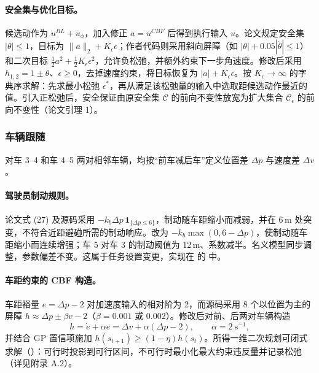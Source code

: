 \documentclass[UTF8,a4paper,zihao=-4,fontset=fandol]{ctexart}
\begin{document}
\paragraph{安全集与优化目标。}
候选动作为 $u^{RL}+\bar u_\phi$，加入修正 $a=u^{CBF}$ 后得到执行输入 $u$。论文规定安全集 $|\theta|\le1$，目标为 $\|a\|_2+K_\epsilon\epsilon$；作者代码则采用斜向屏障（如 $|\theta|+0.05|\dot\theta|\le1$）和二次目标 $\tfrac12a^2+\tfrac12K_\epsilon\epsilon^2$，允许负松弛，并额外约束下一步角速度。修改后采用 $h_{1,2}=1\pm\theta$、$\epsilon\ge0$，去掉速度约束，将目标恢复为 $|a|+K_\epsilon\epsilon$。按 $K_\epsilon\to\infty$ 的字典序求解：先求最小松弛 $\epsilon^*$，再从满足该松弛量的输入中选取距候选动作最近的值。引入正松弛后，安全保证由原安全集 $\mathcal C$ 的前向不变性放宽为扩大集合 $\mathcal C_\epsilon$ 的前向不变性（论文引理 1）。

\subsubsection{车辆跟随}
\label{sec:model-car}
对车 3–4 和车 4–5 两对相邻车辆，均按“前车减后车”定义位置差 $\Delta p$ 与速度差 $\Delta v$。
\paragraph{驾驶员制动规则。}
论文式 (27) 及源码采用 $-k_b\Delta p\,\mathbf{1}_{\{\Delta p\le6\}}$，制动随车距缩小而减弱，并在 6\,m 处突变，不符合近距避碰所需的制动响应。改为 $-k_b\max(0,6-\Delta p)$，使制动随车距缩小而连续增强；车 5 对车 3 的制动阈值为 12\,m、系数减半。名义模型同步调整，参数偏差不变。这属于任务设置变更，实现在  的  中。
\paragraph{车距约束的 CBF 构造。}
车距裕量 $e=\Delta p-2$ 对加速度输入的相对阶为 2，而源码采用 8 个以位置为主的屏障 $h\approx\Delta p\pm\beta v-2$（$\beta=0.001$ 或 0.002）。修改后对前、后两对车辆构造
\begin{equation}
h=\dot e+\alpha e=\Delta v+\alpha(\Delta p-2),\qquad \alpha=2\ \mathrm{s}^{-1},
\label{eq:carcbf}
\end{equation}
并结合 GP 置信项施加 $h(s_{t+1})\ge(1-\eta)h(s_t)$。所得一维二次规划可闭式求解（）：可行时投影到可行区间，不可行时最小化最大约束违反量并记录松弛（详见附录 A.2）。
\end{document}
